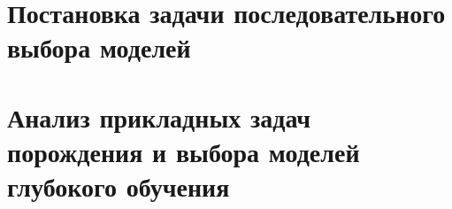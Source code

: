 \documentclass{dissert}
\theoremstyle{definition}
\begin{document}
\iffalse

\tableofcontents{}%

\clearpage
\fi
\chapter{Постановка задачи последовательного выбора моделей}

\iffalse

\clearpage

\chapter{Выбор модели с использованием вариационного вывода}


\clearpage


\chapter{Оптимизация гиперпараметров в задаче выбора модели}


\clearpage
\chapter{Выбор субоптимальной структуры модели}

\clearpage
\fi
\chapter{Анализ прикладных задач порождения и выбора моделей глубокого обучения}

\iffalse
\clearpage
\addcontentsline{toc}{section}{Заключение}

\chapter*{Заключение}

\clearpage
\addcontentsline{toc}{chapter}{Список оcновных обозначений}
\chapter*{Список оcновных обозначений}

\clearpage 
\addcontentsline{toc}{section}{Список иллюстраций}
\listoffigures

\clearpage
\addcontentsline{toc}{section}{Список таблиц}
\listoftables

\clearpage
\fi
{}
\renewcommand{\bibname}{Список использованных источников}


\end{document}
